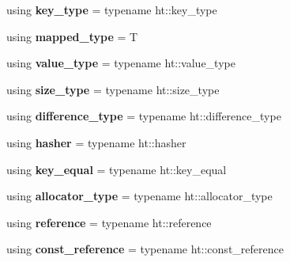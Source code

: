 \begin{DoxyCompactItemize}
\item 
\mbox{\label{classtsl_1_1ordered__map_acbf1805d8d77d895b4e42e2056355476}} 
using {\bfseries key\+\_\+type} = typename ht\+::key\+\_\+type
\item 
\mbox{\label{classtsl_1_1ordered__map_a79ebeb9c609724f908bfc82166f78f78}} 
using {\bfseries mapped\+\_\+type} = T
\item 
\mbox{\label{classtsl_1_1ordered__map_a63a7e2f0a5c74c685ad76b8143e77a7d}} 
using {\bfseries value\+\_\+type} = typename ht\+::value\+\_\+type
\item 
\mbox{\label{classtsl_1_1ordered__map_abbe25131fe5f8312af7f92987e9e422b}} 
using {\bfseries size\+\_\+type} = typename ht\+::size\+\_\+type
\item 
\mbox{\label{classtsl_1_1ordered__map_a721ca5867ac5b24689d03e43680e8df4}} 
using {\bfseries difference\+\_\+type} = typename ht\+::difference\+\_\+type
\item 
\mbox{\label{classtsl_1_1ordered__map_a4de3942f0f1c0f210d0098b7dddd7dbf}} 
using {\bfseries hasher} = typename ht\+::hasher
\item 
\mbox{\label{classtsl_1_1ordered__map_aa1cbeb5130c1f920c9822d9d4587062b}} 
using {\bfseries key\+\_\+equal} = typename ht\+::key\+\_\+equal
\item 
\mbox{\label{classtsl_1_1ordered__map_ae8ec7527e0cf6db5031a4ff20b241188}} 
using {\bfseries allocator\+\_\+type} = typename ht\+::allocator\+\_\+type
\item 
\mbox{\label{classtsl_1_1ordered__map_ad7daea3199663779fb505f1b1de7cbd5}} 
using {\bfseries reference} = typename ht\+::reference
\item 
\mbox{\label{classtsl_1_1ordered__map_a785afe51569fac2305cfb837043a5ccc}} 
using {\bfseries const\+\_\+reference} = typename ht\+::const\+\_\+reference

\end{DoxyCompactItemize}
